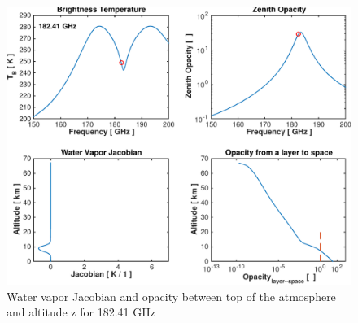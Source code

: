 \documentclass[paper=a4, fontsize=11pt]{scrartcl} %
\numberwithin{figure}{section}
\begin{document}
\begin{figure}[h]
\centering
	\includegraphics[width=\textwidth]{plots/jac_182GHz.pdf}
	\caption{Water vapor Jacobian and opacity between top of the atmosphere and altitude z for 182.41 GHz}
\end{figure}
\end{document}
